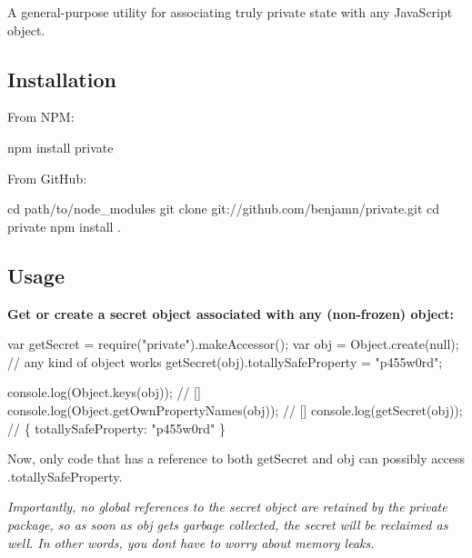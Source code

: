A general-\/purpose utility for associating truly private state with any Java\+Script object.

\subsection*{Installation }

From N\+PM\+: \begin{DoxyVerb}npm install private
\end{DoxyVerb}


From Git\+Hub\+: \begin{DoxyVerb}cd path/to/node_modules
git clone git://github.com/benjamn/private.git
cd private
npm install .
\end{DoxyVerb}


\subsection*{Usage }

{\bfseries Get or create a secret object associated with any (non-\/frozen) object\+:} 
\begin{DoxyCode}
var getSecret = require("private").makeAccessor();
var obj = Object.create(null); // any kind of object works
getSecret(obj).totallySafeProperty = "p455w0rd";

console.log(Object.keys(obj)); // []
console.log(Object.getOwnPropertyNames(obj)); // []
console.log(getSecret(obj)); // \{ totallySafeProperty: "p455w0rd" \}
\end{DoxyCode}
 Now, only code that has a reference to both {\ttfamily get\+Secret} and {\ttfamily obj} can possibly access {\ttfamily .totally\+Safe\+Property}.

{\itshape Importantly, no global references to the secret object are retained by the {\ttfamily private} package, so as soon as {\ttfamily obj} gets garbage collected, the secret will be reclaimed as well. In other words, you don\textquotesingle{}t have to worry about memory leaks.}

